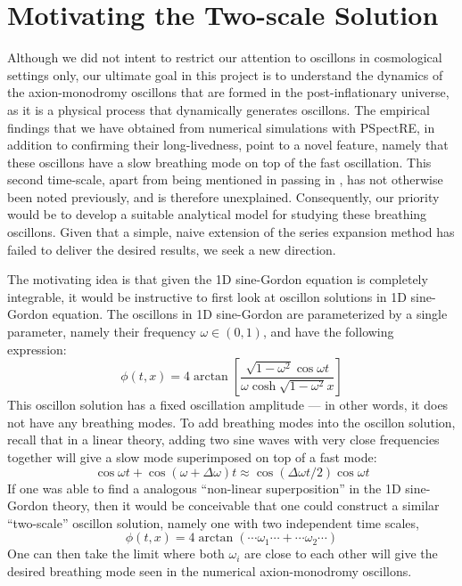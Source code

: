 \documentclass{report}
\begin{document}
\chapter{Motivating the Two-scale Solution}
Although we did not intent to restrict our attention to oscillons in cosmological settings only, our ultimate goal in this project is to understand the dynamics of the axion-monodromy oscillons that are formed in the post-inflationary universe, as it is a physical process that dynamically generates oscillons. The empirical findings that we have obtained from numerical simulations with PSpectRE, in addition to confirming their long-livedness, point to a novel feature, namely that these oscillons have a slow breathing mode on top of the fast oscillation. This second time-scale, apart from being mentioned in passing in \cite{Salmi:2012ta}, has not otherwise been noted previously, and is therefore unexplained. Consequently, our priority would be to develop a suitable analytical model for studying these breathing oscillons. Given that a simple, naive extension of the series expansion method has failed to deliver the desired results, we seek a new direction.

The motivating idea is that given the 1D sine-Gordon equation is completely integrable, it would be instructive to first look at oscillon solutions in 1D sine-Gordon equation. The oscillons in 1D sine-Gordon are parameterized by a single parameter, namely their frequency $\omega\in(0,1)$, and have the following expression:
\begin{equation}\label{onescale}
  \phi(t,x) = 4 \arctan\left[ \frac{\sqrt{1-\omega^2} \cos \omega t}{\omega \cosh \sqrt{1-\omega^2} x} \right]
\end{equation}
This oscillon solution has a fixed oscillation amplitude --- in other words, it does not have any breathing modes. To add breathing modes into the oscillon solution, recall that in a linear theory, adding two sine waves with very close frequencies together will give a slow mode superimposed on top of a fast mode:
\begin{equation}
  \cos \omega t  + \cos(\omega+ \Delta\omega)t\approx \cos (\Delta\omega t/2) \cos\omega t
\end{equation}
If one was able to find a analogous ``non-linear superposition'' in the 1D sine-Gordon theory, then it would be conceivable that one could construct a similar ``two-scale'' oscillon solution, namely one with two independent time scales,
\begin{equation}
  \phi(t,x) = 4\arctan (\cdots \omega_1 \cdots + \cdots \omega_2 \cdots)
\end{equation}
One can then take the limit where both $\omega_i$ are close to each other will give the desired breathing mode seen in the numerical axion-monodromy oscillons.
\end{document}
